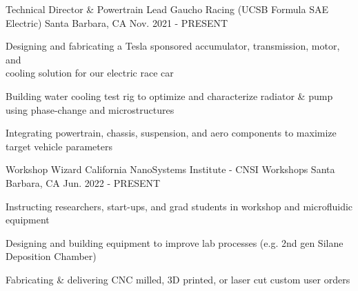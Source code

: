 

\begin{cventries}
\cventry
{Technical Director \& Powertrain Lead} %
{Gaucho Racing (UCSB Formula SAE Electric)} %
{Santa Barbara, CA} %
{Nov. 2021 - PRESENT} %
{ %
\begin{cvitems}   
\item {Designing and fabricating a Tesla sponsored accumulator, transmission, motor, and \\ cooling solution for our electric race car}
\item {Building water cooling test rig to optimize and characterize radiator \& pump using phase-change and microstructures}
\item {Integrating powertrain, chassis, suspension, and aero components to maximize target vehicle parameters}
\end{cvitems}
}


\cventry
{Workshop Wizard} %
{California NanoSystems Institute - CNSI Workshops} %
{Santa Barbara, CA} %
{Jun. 2022 - PRESENT} %
{ %
\begin{cvitems}
\item {Instructing researchers, start-ups, and grad students in workshop and microfluidic equipment}
\item {Designing and building equipment to improve lab processes (e.g. 2nd gen Silane Deposition Chamber)}
\item {Fabricating \& delivering CNC milled, 3D printed, or laser cut custom user orders }
\end{cvitems}
}





\end{cventries}
